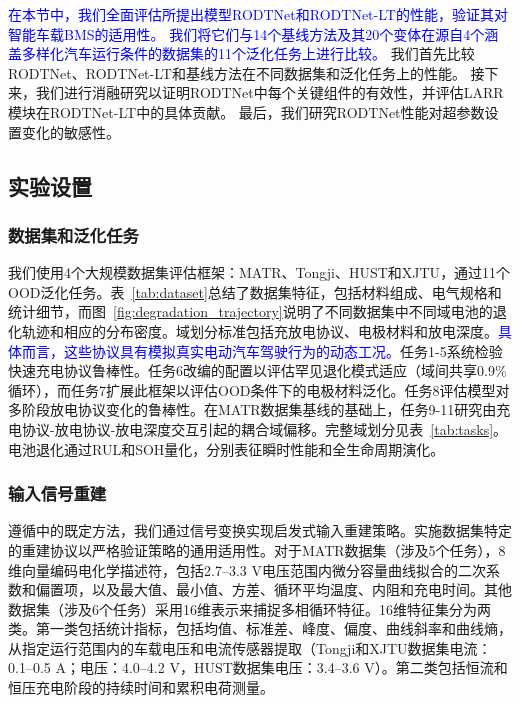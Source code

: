 \documentclass[UTF8,lettersize,journal]{IEEEtran}
\newcommand{\rev}[1]{\textcolor{blue}{#1}}
\begin{document}
\rev{在本节中，我们全面评估所提出模型RODTNet和RODTNet-LT的性能，验证其对智能车载BMS的适用性。
我们将它们与14个基线方法及其20个变体在源自4个涵盖多样化汽车运行条件的数据集的11个泛化任务上进行比较。}
我们首先比较RODTNet、RODTNet-LT和基线方法在不同数据集和泛化任务上的性能。
接下来，我们进行消融研究以证明RODTNet中每个关键组件的有效性，并评估LARR模块在RODTNet-LT中的具体贡献。
最后，我们研究RODTNet性能对超参数设置变化的敏感性。

\subsection{实验设置}\label{subsec:experimental_setup}
  
\subsubsection{数据集和泛化任务}

我们使用4个大规模数据集评估框架：MATR\cite{severson2019data, attia2020closed}、Tongji\cite{zhu2022data}、HUST\cite{D2EE01676A}和XJTU\cite{wang2024physics}，通过11个OOD泛化任务。表~\ref{tab:dataset}总结了数据集特征，包括材料组成、电气规格和统计细节，而图~\ref{fig:degradation_trajectory}说明了不同数据集中不同域电池的退化轨迹和相应的分布密度。域划分标准包括充放电协议、电极材料和放电深度。\rev{具体而言，这些协议具有模拟真实电动汽车驾驶行为的动态工况。}任务1-5\cite{TAN2024103725,10522981}系统检验快速充电协议鲁棒性。任务6改编\cite{TAN2024103725}的配置以评估罕见退化模式适应（域间共享0.9\%循环），而任务7扩展此框架以评估OOD条件下的电极材料泛化。任务8\cite{D2EE01676A}评估模型对多阶段放电协议变化的鲁棒性。在MATR数据集基线的基础上，任务9-11研究由充电协议-放电协议-放电深度交互引起的耦合域偏移。完整域划分见表~\ref{tab:tasks}。电池退化通过RUL和SOH量化，分别表征瞬时性能和全生命周期演化。

\subsubsection{输入信号重建}

遵循\cite{10251604,wang2024physics}中的既定方法，我们通过信号变换实现启发式输入重建策略。实施数据集特定的重建协议以严格验证策略的通用适用性。对于MATR数据集（涉及5个任务），8维向量编码电化学描述符，包括2.7–3.3 V电压范围内微分容量曲线拟合的二次系数和偏置项，以及最大值、最小值、方差、循环平均温度、内阻和充电时间。其他数据集（涉及6个任务）采用16维表示来捕捉多相循环特征。16维特征集分为两类。第一类包括统计指标，包括均值、标准差、峰度、偏度、曲线斜率和曲线熵，从指定运行范围内的车载电压和电流传感器提取（Tongji和XJTU数据集电流：0.1–0.5 A；电压：4.0–4.2 V，HUST数据集电压：3.4–3.6 V）。第二类包括恒流和恒压充电阶段的持续时间和累积电荷测量。
\end{document}
